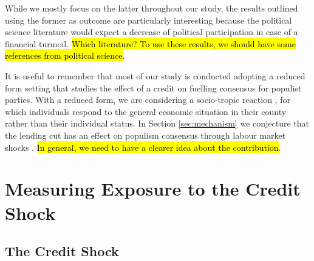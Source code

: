 \documentclass[11pt]{article}
\begin{document}
While we mostly focus on the latter throughout our study, the results outlined using the former as outcome are particularly interesting because the political science literature would expect a decrease of political participation in case of a financial turmoil. \hl{Which literature? To use these results, we should have some references from political science}.

It is useful to remember that most of our study is conducted adopting a reduced form setting that studies the effect of a credit on fuelling consensus for populist parties. With a reduced form, we are considering a socio-tropic reaction \citep[see \textit{e.g.}][]{bib:colantone2018,bib:colantone2018a,bib:gnan2020}, for which individuals respond to the general economic situation in their county rather than their individual status. In Section \ref{sec:mechanism} we conjecture that the lending cut has an effect on populism consensus through labour market shocks \citep[as in][]{bib:dippel2021a}. \hl{In general, we need to have a clearer idea about the contribution}.\\



\section{Measuring Exposure to the Credit Shock}\label{sec:exposure}

\subsection{The Credit Shock}\label{sec:creditshock}
\end{document}
